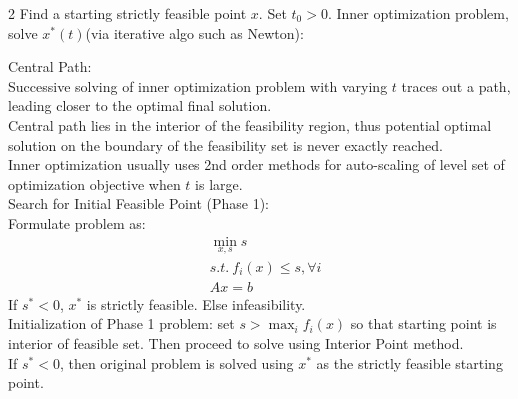 \documentclass[8pt]{extarticle}
\begin{document}
\begin{multicols*}{2}
  Find a starting strictly feasible point $x$. Set $t_0>0$.
  Inner optimization problem, solve $x^*(t)$(via iterative algo such as Newton):
  \begin{algorithm}[H]

    \caption{Log Barrier Method\label{LogBarrierMethod}}
  \end{algorithm}

  Central Path:\\
  Successive solving of inner optimization problem with varying $t$ traces out a path, leading closer to the optimal final solution.\\

  Central path lies in the interior of the feasibility region, thus potential optimal solution on the boundary of the feasibility set is never exactly reached.\\

  Inner optimization usually uses 2nd order methods for auto-scaling of level set of optimization objective when $t$ is large.\\

  \vfill\null
  \pagebreak
  Search for Initial Feasible Point (Phase 1):\\
  Formulate problem as:\\
  \begin{align*}
    &\min_{x,s} s\\
    &s.t.\ f_i(x) \leq s, \forall i\\
    &Ax=b
  \end{align*}
  If $s^* < 0$, $x^*$ is strictly feasible. Else infeasibility.\\
  
  Initialization of Phase 1 problem: set $s > \max_i f_i(x)$ so that starting point is interior of feasible set. Then proceed to solve using Interior Point method.\\

  If $s^* < 0$, then original problem is solved using $x^*$ as the strictly feasible starting point.


\end{multicols*}
\end{document}
